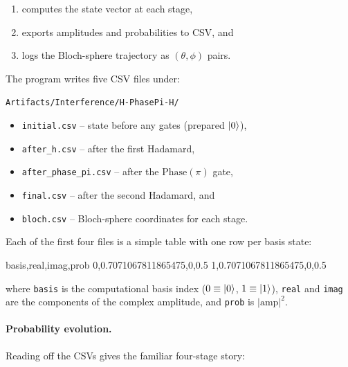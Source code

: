 \documentclass[a4paper,11pt]{article}
\begin{document}
\begin{enumerate}
  \item computes the state vector at each stage,
  \item exports amplitudes and probabilities to CSV, and
  \item logs the Bloch-sphere trajectory as $(\theta,\phi)$ pairs.
\end{enumerate}

The program writes five CSV files under:

\begin{center}
\texttt{Artifacts/Interference/H-PhasePi-H/}
\end{center}

\begin{itemize}
  \item \texttt{initial.csv} – state before any gates (prepared $\lvert 0 \rangle$),
  \item \texttt{after\_h.csv} – after the first Hadamard,
  \item \texttt{after\_phase\_pi.csv} – after the $\mathrm{Phase}(\pi)$ gate,
  \item \texttt{final.csv} – after the second Hadamard, and
  \item \texttt{bloch.csv} – Bloch-sphere coordinates for each stage.
\end{itemize}

Each of the first four files is a simple table with one row per basis state:
\begin{datadumpnofloat}
basis,real,imag,prob
0,0.7071067811865475,0,0.5
1,0.7071067811865475,0,0.5
\end{datadumpnofloat}

where \texttt{basis} is the computational basis index ($0 \equiv \lvert 0 \rangle$, $1 \equiv \lvert 1 \rangle$), \texttt{real} and \texttt{imag} are the components of the complex amplitude, and \texttt{prob} is $\lvert\text{amp}\rvert^{2}$.

\paragraph{Probability evolution.}

Reading off the CSVs gives the familiar four-stage story:
\end{document}
